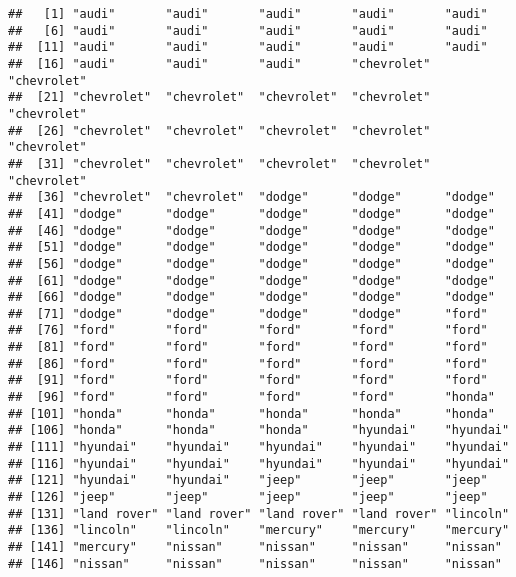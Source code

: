 \documentclass[
]{article}
\newenvironment{Shaded}{\begin{snugshade}}{\end{snugshade}}
\newcommand{\NormalTok}[1]{#1}
\newcommand{\SpecialCharTok}[1]{\textcolor[rgb]{0.00,0.00,0.00}{#1}}
\begin{document}
\begin{Shaded}
\end{Shaded}

\begin{verbatim}
##   [1] "audi"       "audi"       "audi"       "audi"       "audi"      
##   [6] "audi"       "audi"       "audi"       "audi"       "audi"      
##  [11] "audi"       "audi"       "audi"       "audi"       "audi"      
##  [16] "audi"       "audi"       "audi"       "chevrolet"  "chevrolet" 
##  [21] "chevrolet"  "chevrolet"  "chevrolet"  "chevrolet"  "chevrolet" 
##  [26] "chevrolet"  "chevrolet"  "chevrolet"  "chevrolet"  "chevrolet" 
##  [31] "chevrolet"  "chevrolet"  "chevrolet"  "chevrolet"  "chevrolet" 
##  [36] "chevrolet"  "chevrolet"  "dodge"      "dodge"      "dodge"     
##  [41] "dodge"      "dodge"      "dodge"      "dodge"      "dodge"     
##  [46] "dodge"      "dodge"      "dodge"      "dodge"      "dodge"     
##  [51] "dodge"      "dodge"      "dodge"      "dodge"      "dodge"     
##  [56] "dodge"      "dodge"      "dodge"      "dodge"      "dodge"     
##  [61] "dodge"      "dodge"      "dodge"      "dodge"      "dodge"     
##  [66] "dodge"      "dodge"      "dodge"      "dodge"      "dodge"     
##  [71] "dodge"      "dodge"      "dodge"      "dodge"      "ford"      
##  [76] "ford"       "ford"       "ford"       "ford"       "ford"      
##  [81] "ford"       "ford"       "ford"       "ford"       "ford"      
##  [86] "ford"       "ford"       "ford"       "ford"       "ford"      
##  [91] "ford"       "ford"       "ford"       "ford"       "ford"      
##  [96] "ford"       "ford"       "ford"       "ford"       "honda"     
## [101] "honda"      "honda"      "honda"      "honda"      "honda"     
## [106] "honda"      "honda"      "honda"      "hyundai"    "hyundai"   
## [111] "hyundai"    "hyundai"    "hyundai"    "hyundai"    "hyundai"   
## [116] "hyundai"    "hyundai"    "hyundai"    "hyundai"    "hyundai"   
## [121] "hyundai"    "hyundai"    "jeep"       "jeep"       "jeep"      
## [126] "jeep"       "jeep"       "jeep"       "jeep"       "jeep"      
## [131] "land rover" "land rover" "land rover" "land rover" "lincoln"   
## [136] "lincoln"    "lincoln"    "mercury"    "mercury"    "mercury"   
## [141] "mercury"    "nissan"     "nissan"     "nissan"     "nissan"    
## [146] "nissan"     "nissan"     "nissan"     "nissan"     "nissan"    

\end{verbatim}
\end{document}
